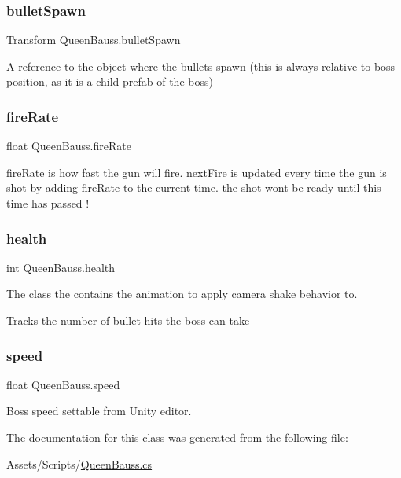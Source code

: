 \subsubsection{\texorpdfstring{bulletSpawn}{bulletSpawn}}
{\footnotesize\ttfamily Transform Queen\+Bauss.\+bullet\+Spawn}



A reference to the object where the bullets spawn (this is always relative to boss position, as it is a child prefab of the boss) 

\mbox{\label{class_queen_bauss_a493ca87e362739138d3a758f267c2f9c}} 
\subsubsection{\texorpdfstring{fireRate}{fireRate}}
{\footnotesize\ttfamily float Queen\+Bauss.\+fire\+Rate}

fire\+Rate is how fast the gun will fire. next\+Fire is updated every time the gun is shot by adding fire\+Rate to the current time. the shot won\textquotesingle{}t be ready until this time has passed ! \mbox{\label{class_queen_bauss_a4b5e0b4ec9040a158c5fafca921593e2}} 
\subsubsection{\texorpdfstring{health}{health}}
{\footnotesize\ttfamily int Queen\+Bauss.\+health}



The class the contains the animation to apply camera shake behavior to. 

Tracks the number of bullet hits the boss can take \mbox{\label{class_queen_bauss_a11c5f07cee01d4587cad453edbb32fa3}} 
\subsubsection{\texorpdfstring{speed}{speed}}
{\footnotesize\ttfamily float Queen\+Bauss.\+speed}



Boss speed settable from Unity editor. 



The documentation for this class was generated from the following file\+:\begin{DoxyCompactItemize}
\item 
Assets/\+Scripts/\mbox{\hyperlink{_queen_bauss_8cs}{Queen\+Bauss.\+cs}}\end{DoxyCompactItemize}
